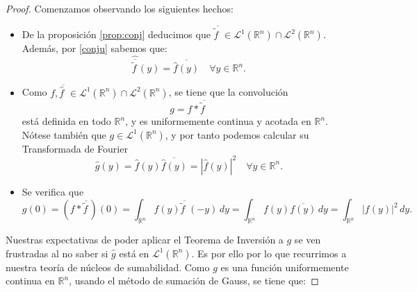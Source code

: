 \begin{proof}
Comenzamos observando los siguientes hechos:
\begin{itemize}
    \item  De la proposición \ref{prop:conj} deducimos que  $\overline{\widetilde{f}\, \, } \in \mathscr{L}^1(\mathbb{R}^n) \cap \mathscr{L}^2(\mathbb{R}^n)$.
    Además, por \ref{conju} sabemos que:
    \begin{equation}
\widehat{\overline{\widetilde{f}\,}}(y)= \overline{\widehat{f}(y)}\quad \forall y \in \mathbb{R}^n.
    \end{equation}

    \item Como $f,\overline{\widehat{f}\, \, }\in \mathscr{L}^1(\mathbb{R}^n) \cap \mathscr{L}^2(\mathbb{R}^n)$, se tiene que la convolución
    \begin{equation}
        g = f*\overline{\widetilde{f}\, \, }
    \end{equation}
    está definida en todo $\mathbb{R}^n$, y es uniformemente continua y acotada en $\mathbb{R}^n$. Nótese también que $g \in \mathscr{L}^1(\mathbb{R}^n)$, y por tanto podemos calcular su Transformada de Fourier
    \begin{equation}
        \widehat{g}(y) = \widehat{f}(y)\overline{\widehat{f}(y)} = |\widehat{f}(y)|^2 \quad \forall y \in \mathbb{R}^n.
    \end{equation}
    \item 
    Se verifica que
    \begin{equation}\label{eq_g}
        g(0) = (f*\overline{\widetilde{f}\,})(0) = \int_{ \mathbb{R}^n} f(y)\overline{\widetilde{f}\, \, }(-y) \, dy = \int_{\mathbb{R}^n}f(y)\overline{f(y)} \, dy = \int_{\mathbb{R}^n} |f(y)|^2 \, dy.
    \end{equation}
\end{itemize}
Nuestras expectativas de poder aplicar el Teorema de Inversión a $g$ se ven frustradas al no saber si $\widehat{g}$ está en $\mathscr{L}^1(\mathbb{R}^n)$. Es por ello por lo que recurrimos a nuestra teoría de núcleos de sumabilidad. Como $g$ es una función uniformemente continua en $\mathbb{R}^n$, usando el método de sumación de Gauss, se tiene que:


\end{proof}
